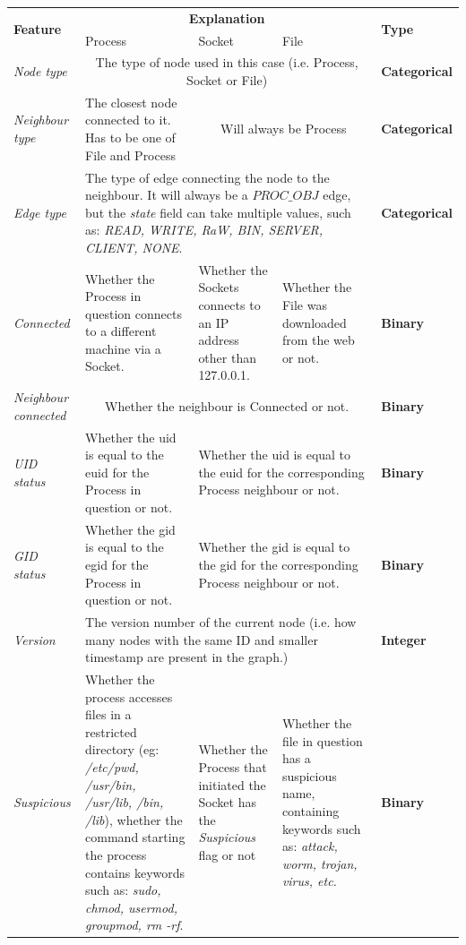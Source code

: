 	
	\begin{longtable}{| p{} || p{} | p{} | p{} | p{} |}
		\hline
		\multirow{2}{3cm}{\textbf{Feature}} & \multicolumn{3}{c|}{\textbf{Explanation}} & \multirow{2}{2cm}{\textbf{Type}}\\
		& Process & Socket & File &\\
		\hline
		\textit{Node type} & \multicolumn{3}{c|}{The type of node used in this case (i.e. Process, Socket or File)} & \textbf{Categorical} \\
		\hline
		\textit{Neighbour type} & The closest node connected to it. Has to be one of File and Process & 
		\multicolumn{2}{c|}{Will always be Process} & \textbf{Categorical}\\
		\hline
		\textit{Edge type} & \multicolumn{3}{p{.75\textwidth}|}{The type of edge connecting the node to the neighbour. It will always be a $PROC\_OBJ$ edge, but the \textit{state} field can take multiple values, such as:  \textit{READ, WRITE, RaW, BIN, SERVER, CLIENT, NONE}.} & \textbf{Categorical}\\
		\hline
		\textit{Connected} & Whether the Process in question connects to a different machine via a Socket. & Whether the Sockets connects to an IP address other than 127.0.0.1. & Whether the File was downloaded from the web or not. & \textbf{Binary} \\
		\hline
		\textit{Neighbour connected} & \multicolumn{3}{c|}{Whether the neighbour is Connected or not.} & \textbf{Binary} \\ 
		\hline
		\textit{UID status} & Whether the uid is equal to the euid for the Process in question or not. & \multicolumn{2}{p{.50\textwidth}|}{Whether the uid is equal to the euid for the corresponding Process neighbour or not.} & \textbf{Binary} \\
		\hline
		\textit{GID status } & Whether the gid is equal to the egid for the Process in question or not. & \multicolumn{2}{p{.50\textwidth}|}{Whether the gid is equal to the gid for the corresponding Process neighbour or not.} & \textbf{Binary} \\
		\hline
		\textit{Version} & \multicolumn{3}{p{.75\textwidth}|}{The version number of the current node (i.e. how many nodes with the same ID and smaller timestamp are present in the graph.)} & \textbf{Integer} \\
		\hline
		\textit{Suspicious} & Whether the process accesses files in a restricted directory (eg: \textit{/etc/pwd, /usr/bin, /usr/lib, /bin, /lib}), whether the command starting the process contains keywords such as: \textit{sudo, chmod, usermod, groupmod, rm -rf}. & Whether the Process that initiated the Socket has the \textit{Suspicious} flag or not &Whether the file in question has a suspicious name, containing keywords such as: \textit{attack, worm, trojan, virus, etc.} & \textbf{Binary} \\

\end{longtable}
